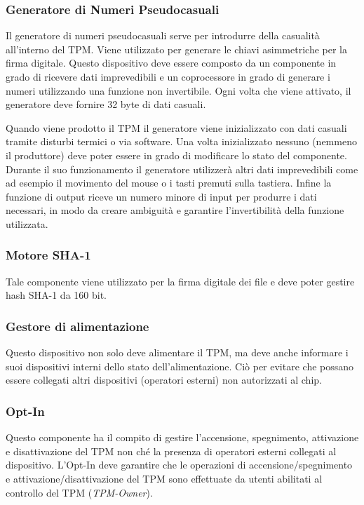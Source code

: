 \subsubsection{Generatore di Numeri Pseudocasuali}
Il generatore di numeri pseudocasuali serve per introdurre della casualità all'interno del TPM. Viene utilizzato per generare le chiavi asimmetriche per la firma digitale. Questo dispositivo deve essere composto da un componente in grado di ricevere dati imprevedibili e un coprocessore in grado di generare i numeri utilizzando una funzione non invertibile. Ogni volta che viene attivato, il generatore deve fornire 32 byte di dati casuali.

Quando viene prodotto il TPM il generatore viene inizializzato con dati casuali tramite disturbi termici o via software. Una volta inizializzato nessuno (nemmeno il produttore) deve poter essere in grado di modificare lo stato del componente. Durante il suo funzionamento il generatore utilizzerà altri dati imprevedibili come ad esempio il movimento del mouse o i tasti premuti sulla tastiera. Infine la funzione di output riceve un numero minore di input per produrre i dati necessari, in modo da creare ambiguità e garantire l'invertibilità della funzione utilizzata.

\subsubsection{Motore SHA-1}
Tale componente viene utilizzato per la firma digitale dei file e deve poter gestire hash SHA-1 da 160 bit.

\subsubsection{Gestore di alimentazione}
Questo dispositivo non solo deve alimentare il TPM, ma deve anche informare i suoi dispositivi interni dello stato dell'alimentazione. Ciò per evitare che possano essere collegati altri dispositivi (operatori esterni) non autorizzati al chip.

\subsubsection{Opt-In}
Questo componente ha il compito di gestire l'accensione, spegnimento, attivazione e disattivazione del TPM non ché la presenza di operatori esterni collegati al dispositivo. L'Opt-In deve garantire che le operazioni di accensione/spegnimento e attivazione/disattivazione del TPM sono effettuate da utenti abilitati al controllo del TPM (\textit{TPM-Owner}).

